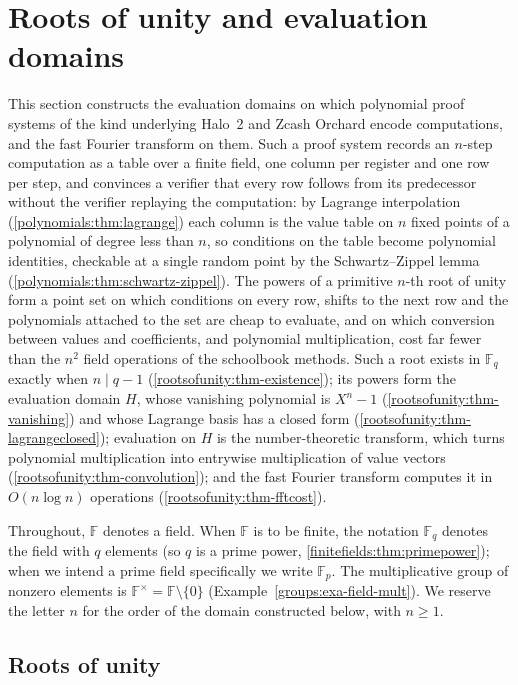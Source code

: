 \documentclass[11pt,a4paper]{article}
\theoremstyle{definition}
\theoremstyle{remark}
\newcommand{\F}{\ensuremath{\mathbb{F}}}
\newcommand{\Fp}{\ensuremath{\mathbb{F}_{p}}}
\newcommand{\Fq}{\ensuremath{\mathbb{F}_{q}}}
\begin{document}
\section{Roots of unity and evaluation domains}\label{sec:rootsofunity}

This section constructs the evaluation domains on which polynomial proof
systems of the kind underlying Halo~2 and Zcash Orchard encode computations,
and the fast Fourier transform on them. Such a proof system records an
\(n\)-step computation as a table over a finite field, one column per
register and one row per step, and convinces a verifier that every row
follows from its predecessor without the verifier replaying the
computation: by Lagrange interpolation (\cref{polynomials:thm:lagrange})
each column is the value table on \(n\) fixed points of a polynomial of
degree less than \(n\), so conditions on the table become polynomial
identities, checkable at a single random point by the Schwartz--Zippel
lemma (\cref{polynomials:thm:schwartz-zippel}). The powers of a
primitive \(n\)-th root of unity form a point set on which conditions on
every row, shifts to the next row and the polynomials attached to the set are
cheap to evaluate, and on which conversion between values and
coefficients, and polynomial multiplication, cost far fewer than the
\(n^2\) field operations of the schoolbook methods. Such a root exists in
\(\Fq\) exactly when \(n \mid q - 1\) (\cref{rootsofunity:thm-existence});
its powers form the evaluation domain \(H\), whose vanishing polynomial is
\(X^n - 1\) (\cref{rootsofunity:thm-vanishing}) and whose Lagrange basis
has a closed form (\cref{rootsofunity:thm-lagrangeclosed}); evaluation on
\(H\) is the number-theoretic transform, which turns polynomial
multiplication into entrywise multiplication of value vectors
(\cref{rootsofunity:thm-convolution}); and the fast Fourier transform
computes it in \(O(n \log n)\) operations (\cref{rootsofunity:thm-fftcost}).

Throughout, \(\F\) denotes a field. When \(\F\) is to be finite, the
notation \(\Fq\) denotes the field with \(q\) elements (so \(q\) is a
prime power, \cref{finitefields:thm:primepower}); when we intend a prime
field specifically we write \(\Fp\). The multiplicative group of nonzero
elements is \(\F^\times = \F \setminus \{0\}\)
(Example~\ref{groups:exa-field-mult}). We reserve the letter \(n\) for the
order of the domain constructed below, with \(n \ge 1\).

\subsection{Roots of unity}\label{rootsofunity:sub-roots}
\end{document}
